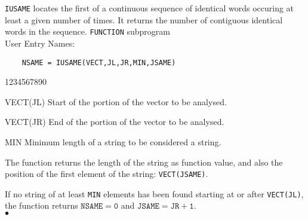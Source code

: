                      
                   
\Submitter{}                           
         
{\tt IUSAME} locates the first of a continuous sequence of identical
words occuring at least a given number of times. It returns the
number of contiguous identical words in the sequence.
\Structure
{\tt FUNCTION} subprogram \\
User Entry Names: 
\Usage
\begin{verbatim}
    NSAME = IUSAME(VECT,JL,JR,MIN,JSAME)
\end{verbatim}
\begin{DLtt}{1234567890}
\item [VECT(JL)] Start of the portion of the vector to be analysed.
\item [VECT(JR)] End of the portion of the vector to be analysed.
\item [MIN] Minimum length of a string to be considered a string.
\end{DLtt}
The function returns the length of the string as function
value, and also the position of the first element of the string:
{\tt VECT(JSAME)}.
\par
If no string of at least {\tt MIN} elements has been found starting
at or after {\tt VECT(JL)}, the function returns $\mathtt{NSAME=0}$ and
$\mathtt{JSAME=JR+1}$.
\\ $\bullet$
